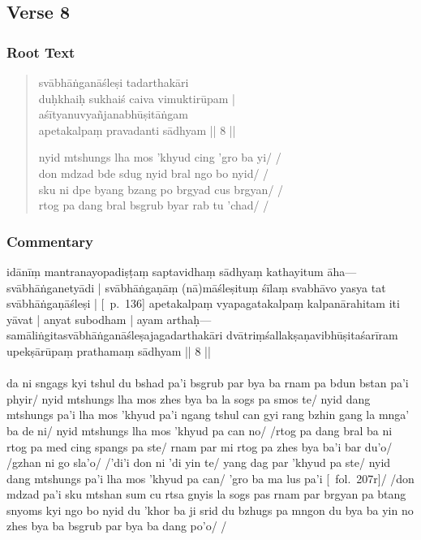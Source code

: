 \documentclass[12pt]{article}
\newcommand{\emdash} {\hspace{0em}—\hspace{0em}}
\begin{document}
\subsection{Verse 8}
\subsubsection{Root Text}
\begin{quote}
	svābhāṅganāśleṣi tadarthakāri\footnoteB{
		tadarthakāri] \EDD\ ; ta..rthakāri \MS\ (\emph{akṣara uncertain})
	} \\
	duḥkhaiḥ sukhaiś caiva vimuktirūpam |\\
	aśītyanuvyañjanabhūṣitāṅgam \\
	apetakalpaṃ pravadanti sādhyam || 8 ||

	nyid mtshungs lha mos 'khyud cing 'gro ba yi/ /\\
	don mdzad bde sdug nyid bral ngo bo nyid/ /\\
	sku ni dpe byang bzang po brgyad cus brgyan/ /\\
	rtog pa dang bral bsgrub byar rab tu 'chad/ /
\end{quote}

\subsubsection{Commentary}
idānīṃ mantranayopadiṣṭaṃ saptavidhaṃ sādhyaṃ kathayitum āha\emdash svābhāṅganetyādi | svābhāṅgaṇāṃ (nā)māśleṣituṃ śīlaṃ svabhāvo yasya tat svābhāṅgaṇāśleṣi | [\EDD\ p.\ 136] apetakalpaṃ vyapagatakalpaṃ kalpanārahitam iti yāvat | anyat subodham | ayam arthaḥ\emdash samāliṅgitasvābhāṅganāśleṣajagadarthakāri dvātriṃśallakṣaṇavibhūṣitaśarīram upekṣārūpaṃ prathamaṃ sādhyam || 8 ||\\

\textbf{\TVA}\\
da ni sngags kyi tshul du bshad pa'i bsgrub par bya ba rnam pa bdun bstan pa'i phyir/ nyid mtshungs lha mos zhes bya ba la sogs pa smos te/ nyid dang mtshungs pa'i lha mos 'khyud pa'i ngang tshul can gyi rang bzhin gang la mnga' ba de ni/ nyid mtshungs lha mos 'khyud pa can no/ /rtog pa dang bral ba ni rtog pa med cing spangs pa ste/ rnam par mi rtog pa zhes bya ba'i bar du'o/ /gzhan ni go sla'o/ /'di'i don ni 'di yin te/ yang dag par 'khyud pa ste/ nyid dang mtshungs pa'i lha mos 'khyud pa can/ 'gro ba ma lus pa'i [\TVA\ fol.\ 207r]/ /don mdzad pa'i sku mtshan sum cu rtsa gnyis la sogs pas rnam par brgyan pa btang snyoms kyi ngo bo nyid du 'khor ba ji srid du bzhugs pa mngon du bya ba yin no zhes bya ba bsgrub par bya ba dang po'o/ /\\
\end{document}

